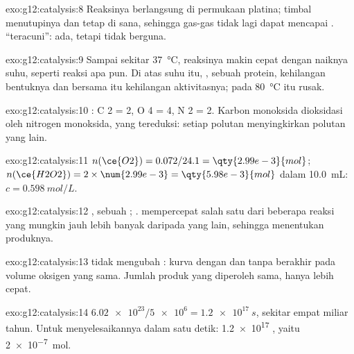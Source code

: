 \begin{solution}{exo:g12:catalysis:8}
Reaksinya berlangsung di permukaan platina; timbal menutupinya dan
tetap di sana, sehingga gas-gas tidak lagi dapat mencapai .
 ``teracuni'': ada, tetapi tidak berguna.
\end{solution}

\begin{solution}{exo:g12:catalysis:9}
Sampai sekitar \qty{37}{\celsius}, reaksinya makin cepat dengan naiknya
suhu, seperti reaksi apa pun. Di atas suhu itu, , sebuah
protein, kehilangan bentuknya dan bersama itu kehilangan aktivitasnya;
pada \qty{80}{\celsius}  itu rusak.
\end{solution}

\begin{solution}{exo:g12:catalysis:10}
: C 2 = 2, O 4 = 4, N 2 = 2. Karbon
monoksida dioksidasi oleh nitrogen monoksida, yang tereduksi: setiap
polutan menyingkirkan polutan yang lain.
\end{solution}

\begin{solution}{exo:g12:catalysis:11}
$n(\ce{O2}) = 0.072 / 24.1 = \qty{2.99e-3}{mol}$;
$n(\ce{H2O2}) = 2 \times \num{2.99e-3} = \qty{5.98e-3}{mol}$ dalam
\qty{10.0}{mL}: $c = \qty{0.598}{mol/L}$.
\end{solution}

\begin{solution}{exo:g12:catalysis:12}
, sebuah ; .
 mempercepat salah satu dari beberapa reaksi yang
mungkin jauh lebih banyak daripada yang lain, sehingga menentukan
produknya.
\end{solution}

\begin{solution}{exo:g12:catalysis:13}
 tidak mengubah : kurva dengan dan tanpa 
berakhir pada volume oksigen yang sama. Jumlah produk yang diperoleh
sama, hanya lebih cepat.
\end{solution}

\begin{solution}{exo:g12:catalysis:14}
$\num{6.02e23} / \num{5e6} = \qty{1.2e17}{s}$, sekitar empat miliar
tahun. Untuk menyelesaikannya dalam satu detik: \num{1.2e17} 
, yaitu \qty{2e-7}{mol}.
\end{solution}

